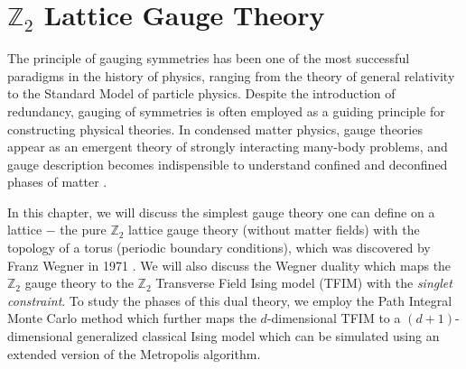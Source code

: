 \documentclass[../thesis_main.tex]{subfiles}
\begin{document}
\chapter{$\mathbb{Z}_2$ Lattice Gauge Theory}
The principle of gauging symmetries has been one of the most successful paradigms in the history of physics, ranging from the theory of general relativity to the Standard Model of particle physics. Despite the introduction of redundancy, gauging of symmetries is often employed as a guiding principle for constructing physical theories. In condensed matter physics, gauge theories appear as an emergent theory of strongly interacting many-body problems, and gauge description becomes indispensible to understand confined and deconfined phases of matter \cite{Sergej,Mathur_et_al}. 

In this chapter, we will discuss the simplest gauge theory one can define on a lattice $-$ the pure $\mathbb{Z}_2$ lattice gauge theory (without matter fields) with the topology of a torus (periodic boundary conditions), which was discovered by Franz Wegner in 1971 \cite{wegner2014duality}. We will also discuss the Wegner duality which maps the $\mathbb{Z}_2$ gauge theory to the $\mathbb{Z}_2$ Transverse Field Ising model (TFIM) with the \textit{singlet constraint}. To study the phases of this dual theory, we employ the Path Integral Monte Carlo method which further maps the $d$-dimensional TFIM to a $(d+1)$-dimensional generalized classical Ising model which can be simulated using an extended version of the Metropolis algorithm.
\end{document}
